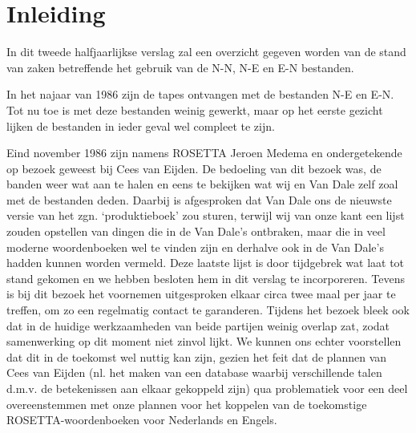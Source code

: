 
   \RosDate{\today}
   \RosSupersedes{-}
   \MakeRosTitle

\section{Inleiding}
In dit tweede halfjaarlijkse verslag zal een overzicht gegeven worden van de 
stand van zaken betreffende het gebruik van de N-N, N-E en E-N bestanden.

In het najaar van 1986 zijn de tapes ontvangen met de bestanden N-E en E-N.
Tot nu toe is met deze bestanden weinig gewerkt, maar op het eerste gezicht
lijken de bestanden in ieder geval wel compleet te zijn.

Eind november 1986 zijn namens ROSETTA Jeroen Medema en ondergetekende op 
bezoek geweest bij Cees van Eijden. De bedoeling van dit bezoek was, de 
banden weer wat aan te halen en eens te bekijken wat wij en Van Dale zelf
zoal met de bestanden deden. Daarbij is afgesproken dat Van Dale ons de nieuwste
versie van het zgn. `produktieboek' zou sturen, terwijl wij van onze kant een
lijst zouden opstellen van dingen die in de Van Dale's ontbraken, maar die 
in veel moderne woordenboeken wel te vinden zijn en derhalve ook in de Van 
Dale's hadden kunnen worden vermeld. Deze laatste lijst is door tijdgebrek wat 
laat tot stand gekomen en we hebben besloten hem in dit verslag te incorporeren.
Tevens is bij dit bezoek het voornemen uitgesproken elkaar circa twee maal per 
jaar te treffen, om zo een regelmatig contact te garanderen. Tijdens het bezoek
bleek ook dat in de huidige werkzaamheden van beide partijen weinig overlap zat,
zodat samenwerking op dit moment niet zinvol lijkt. We kunnen
ons echter voorstellen dat dit in de toekomst wel nuttig
kan zijn, gezien het feit dat de plannen van Cees van Eijden (nl. het maken van 
een database waarbij verschillende talen d.m.v. de betekenissen aan elkaar
gekoppeld zijn) qua problematiek voor een deel overeenstemmen met onze plannen
voor het koppelen van de toekomstige ROSETTA-woordenboeken voor Nederlands en 
Engels. 

